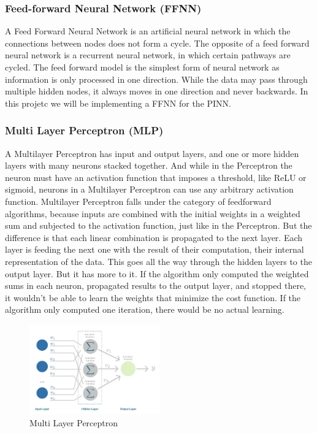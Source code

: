 \documentclass{article}
\begin{document}
\subsubsection{Feed-forward Neural Network (FFNN)}

A Feed Forward Neural Network is an artificial neural network in which the connections between nodes does not form a cycle. 
The opposite of a feed forward neural network is a recurrent neural network, in which certain pathways are cycled. 
The feed forward model is the simplest form of neural network as information is only processed in one direction. While the data may pass through multiple hidden nodes, 
it always moves in one direction and never backwards. In this projetc we will be implementing a FFNN for the PINN.

\subsubsection{Multi Layer Perceptron (MLP)}

A Multilayer Perceptron has input and output layers, and one or more hidden layers with many neurons stacked together. And while in the Perceptron the neuron must have an activation function that imposes a threshold, like ReLU or sigmoid, neurons in a Multilayer Perceptron can use any arbitrary activation function.
Multilayer Perceptron falls under the category of feedforward algorithms, because inputs are combined with the initial weights in a weighted sum and subjected to the activation function, just like in the Perceptron. But the difference is that each linear combination is propagated to the next layer.
Each layer is feeding the next one with the result of their computation, their internal representation of the data. This goes all the way through the hidden layers to the output layer.
But it has more to it.
If the algorithm only computed the weighted sums in each neuron, propagated results to the output layer, and stopped there, it wouldn’t be able to learn the weights that minimize the cost function. If the algorithm only computed one iteration, there would be no actual learning.

\begin{figure}[H]
    \centering
    \includegraphics[width=0.5\textwidth]{images/MLP.png}
    \caption{Multi Layer Perceptron}
\end{figure}
\end{document}
